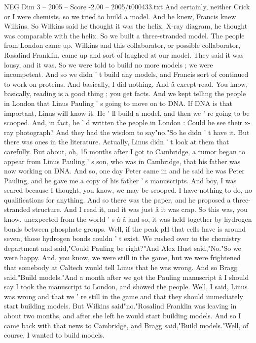 \begin{textsample}{NEG Dim 3 – 2005 – Score -2.00 – 2005/t000433.txt}
And certainly, neither Crick or I were chemists, so we tried to build a model.
And he knew, Francis knew Wilkins.
So Wilkins said he thought it was the helix.
X-ray diagram, he thought was comparable with the helix.
So we built a three-stranded model.
The people from London came up.
Wilkins and this collaborator, or possible collaborator, Rosalind Franklin, came up and sort of laughed at our model.
They said it was lousy, and it was.
So we were told to build no more models ; we were incompetent.
And so we didn ' t build any models, and Francis sort of continued to work on proteins.
And basically, I did nothing.
And â except read.
You know, basically, reading is a good thing ; you get facts.
And we kept telling the people in London that Linus Pauling ' s going to move on to DNA.
If DNA is that important, Linus will know it.
He ' ll build a model, and then we ' re going to be scooped.
And, in fact, he ' d written the people in London : Could he see their x-ray photograph?
And they had the wisdom to say"no."So he didn ' t have it.
But there was ones in the literature.
Actually, Linus didn ' t look at them that carefully.
But about, oh, 15 months after I got to Cambridge, a rumor began to appear from Linus Pauling ' s son, who was in Cambridge, that his father was now working on DNA.
And so, one day Peter came in and he said he was Peter Pauling, and he gave me a copy of his father ' s manuscripts.
And boy, I was scared because I thought, you know, we may be scooped.
I have nothing to do, no qualifications for anything.
And so there was the paper, and he proposed a three-stranded structure.
And I read it, and it was just â it was crap.
So this was, you know, unexpected from the world ' s â â and so, it was held together by hydrogen bonds between phosphate groups.
Well, if the peak pH that cells have is around seven, those hydrogen bonds couldn ' t exist.
We rushed over to the chemistry department and said,"Could Pauling be right?"And Alex Hust said,"No."So we were happy.
And, you know, we were still in the game, but we were frightened that somebody at Caltech would tell Linus that he was wrong.
And so Bragg said,"Build models."And a month after we got the Pauling manuscript â I should say I took the manuscript to London, and showed the people.
Well, I said, Linus was wrong and that we ' re still in the game and that they should immediately start building models.
But Wilkins said"no."Rosalind Franklin was leaving in about two months, and after she left he would start building models.
And so I came back with that news to Cambridge, and Bragg said,"Build models."Well, of course, I wanted to build models.

\end{textsample}
